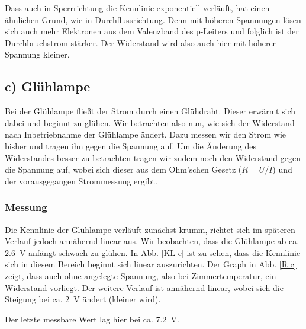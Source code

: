 \documentclass[11pt,a4paper,titlepage, ngerman]{article}
\begin{document}
				Dass auch in Sperrrichtung die Kennlinie exponentiell verläuft, hat einen ähnlichen Grund, wie in Durchflussrichtung.
				Denn mit höheren Spannungen lösen sich auch mehr Elektronen aus dem Valenzband des p-Leiters und folglich ist der Durchbruchstrom stärker.
				Der Widerstand wird also auch hier mit höherer Spannung kleiner. 
				
		\subsection{c) Glühlampe} 
			
			Bei der Glühlampe fließt der Strom durch einen Glühdraht.
			Dieser erwärmt sich dabei und beginnt zu glühen.
			Wir betrachten also nun, wie sich der Widerstand nach Inbetriebnahme der Glühlampe ändert.
			Dazu messen wir den Strom wie bisher und tragen ihn gegen die Spannung auf.
			Um die Änderung des Widerstandes besser zu betrachten tragen wir zudem noch den Widerstand gegen die Spannung auf, wobei sich dieser aus dem Ohm'schen Gesetz ($R = U / I$) und der vorausgegangen Strommessung ergibt.  
			
			\subsubsection*{Messung}
				
				Die Kennlinie der Glühlampe verläuft zunächst krumm, richtet sich im späteren Verlauf jedoch annähernd linear aus. Wir beobachten, dass die Glühlampe ab ca. \SI{2.6}{\V} anfängt schwach zu glühen. In Abb. \ref{KL c} ist zu sehen, dass die Kennlinie sich in diesem Bereich beginnt sich linear auszurichten.
				Der Graph in Abb. \ref{R c} zeigt, dass auch ohne angelegte Spannung, also bei Zimmertemperatur, ein Widerstand vorliegt. Der weitere Verlauf ist annähernd linear, wobei sich die Steigung bei ca. \SI{2}{\V} ändert (kleiner wird).
				
				Der letzte messbare Wert lag hier bei ca. \SI{7.2}{\V}.
				
\end{document}
